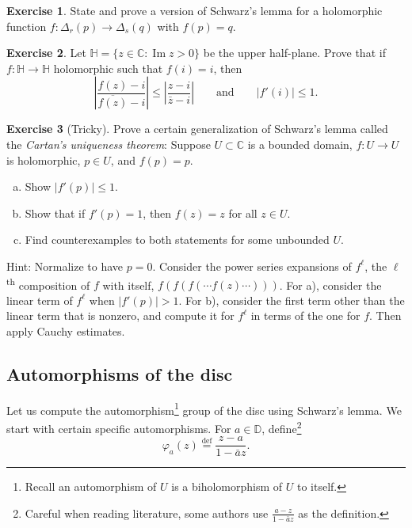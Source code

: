 \documentclass[12pt,openany]{book}
\renewcommand{\Im}{\operatorname{Im}}
\newcommand{\abs}[1]{\left\lvert {#1} \right\rvert}
\newcommand{\C}{{\mathbb{C}}}
\newcommand{\D}{{\mathbb{D}}}
\newcommand{\bH}{{\mathbb{H}}}
\newcommand{\myindex}[1]{#1\index{#1}}
\theoremstyle{plain}
\theoremstyle{remark}
\theoremstyle{definition}
\newenvironment{exbox}{%
    \def\FrameCommand{\vrule width 1pt \relax\hspace{10pt}}%
    \MakeFramed{\advance\hsize-\width\FrameRestore}%
}{%
    \endMakeFramed
}
\newenvironment{exparts}{%
    \leavevmode\begin{enumerate}[a),noitemsep,topsep=0pt,parsep=0pt,partopsep=0pt]
}{%
    \end{enumerate}
}
\theoremstyle{exercise}
\newtheorem{exercise}{Exercise}[section]
\theoremstyle{example}
\begin{document}
\begin{exbox}
\begin{exercise}
State and prove a version of Schwarz's lemma for a holomorphic
function $f \colon \Delta_r(p) \to \Delta_s(q)$ with $f(p)=q$.
\end{exercise}

\begin{exercise}
Let $\bH = \{ z \in \C : \Im z > 0 \}$ be the upper half-plane.
Prove that if $f \colon \bH \to \bH$ holomorphic such that $f(i) = i$, then
\begin{equation*}
\abs{\frac{f(z)-i}{\overline{f(z)}-i}} \leq
\abs{\frac{z-i}{\bar{z}-i}} 
\qquad
\text{and}
\qquad
\abs{f'(i)} \leq 1 .
\end{equation*}
\end{exercise}

\begin{exercise}[Tricky]
Prove a certain generalization of Schwarz's lemma
called the \emph{\myindex{Cartan's uniqueness theorem}}:
Suppose $U \subset \C$
is a bounded domain,
$f \colon U \to U$ is holomorphic,
$p \in U$,
and $f(p)=p$.
\begin{exparts}
\item
Show $\abs{f'(p)} \leq 1$.
\item
Show that if $f'(p) = 1$, then $f(z) = z$ for all $z \in U$.
\item
Find counterexamples to both statements for some unbounded $U$.
\end{exparts}
Hint: Normalize to have $p=0$.  Consider the power series
expansions of
$f^{\ell}$, the $\ell$\textsuperscript{th} composition of $f$ with itself,
$f(f(f(\cdots f(z) \cdots)))$.
For a), consider the linear term of $f^{\ell}$ when $\abs{f'(p)}
> 1$.  For b), consider the first term other
than the linear term that is nonzero, and compute it for $f^{\ell}$ in terms
of the one for $f$.  Then apply Cauchy estimates.
\end{exercise}
\end{exbox}

\subsection{Automorphisms of the disc}

Let us compute the automorphism\footnote{Recall an automorphism of $U$ is a
biholomorphism of $U$ to itself.}
group of the disc using Schwarz's lemma.
We start with certain specific automorphisms.
For $a \in \D$, define\footnote{%
Careful when reading literature, some authors use $\frac{a-z}{1-\bar{a}z}$ as the definition.}
%
\begin{equation*}
\varphi_a(z) \overset{\text{def}}{=} \frac{z-a}{1-\bar{a}z}.
\end{equation*}
\end{document}
